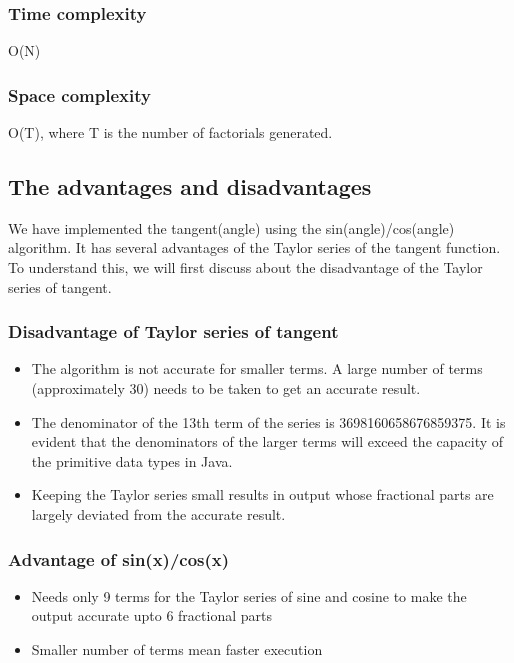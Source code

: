 \documentclass[12pt]{article}
\begin{document}
\subsubsection{Time complexity}
O(N)
\subsubsection{Space complexity}
O(T), where T is the number of factorials generated.
\subsection{The advantages and disadvantages}
We have implemented the tangent(angle) using the sin(angle)/cos(angle) algorithm. It has several advantages of the Taylor series of the tangent function. To understand this, we will first discuss about the disadvantage of the Taylor series of tangent.
\subsubsection{Disadvantage of Taylor series of tangent}
\begin{itemize}
    \item The algorithm is not accurate for smaller terms. A large number of terms (approximately 30) needs to be taken to get an accurate result.
    \item The denominator of the 13th term of the series is 3698160658676859375. It is evident that the denominators of the larger terms will exceed the capacity of the primitive data types in Java.
    \item Keeping the Taylor series small results in output whose fractional parts are largely deviated from the accurate result.
\end{itemize}
\subsubsection{Advantage of sin(x)/cos(x)}
\begin{itemize}
    \item Needs only 9 terms for the Taylor series of sine and cosine to make the output accurate upto 6 fractional parts
    \item Smaller number of terms mean faster execution
\end{itemize}
\end{document}
